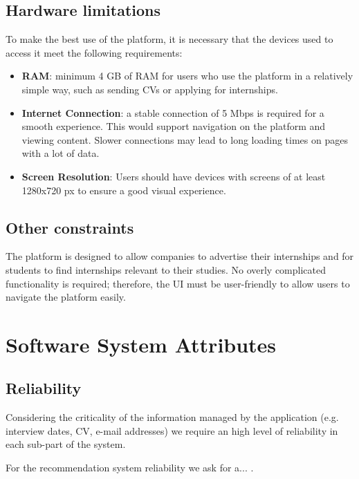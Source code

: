		\subsection{Hardware limitations}
		
			To make the best use of the platform, it is necessary that the devices used to access it meet the following requirements:
			
			\begin{itemize}
				\item \textbf{RAM}: minimum 4 GB of RAM for users who use the platform in a relatively simple way, such as sending CVs or applying for internships.
				\item\textbf{Internet Connection}: a stable connection of 5 Mbps is required for a smooth experience. This would support navigation on the platform and viewing content. Slower connections may lead to long loading times on pages with a lot of data.
				\item \textbf{Screen Resolution}: Users should have devices with screens of at least 1280x720 px to ensure a good visual experience.
			\end{itemize}
			
			
		\subsection{Other constraints}
			The platform is designed to allow companies to advertise their internships and for students to find internships relevant to their studies. No overly complicated functionality is required; therefore, the UI must be user-friendly to allow users to navigate the platform easily.
	\section{Software System Attributes}
		\subsection{Reliability}
			Considering the criticality of the information managed by the application (e.g. interview dates, CV, e-mail addresses) we require an high level of reliability in each sub-part of the system.
			
			For the recommendation system reliability we ask for a... .
